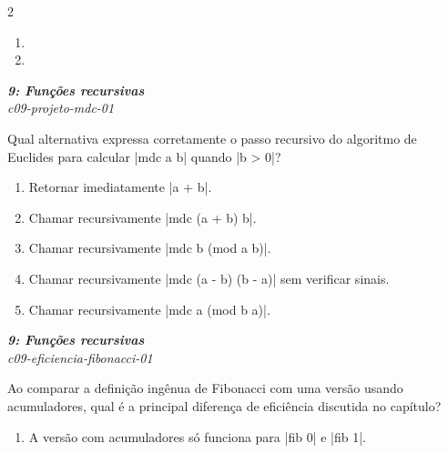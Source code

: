 \documentclass[a4paper,10pt,brazil]{article}
\begin{document}
\begin{multicols}{2}
\begin{enumerate}
  \item {}

  \item {}


\end{enumerate}

\begin{flushright}
  \footnotesize
  \textit{\textbf{9: Funções recursivas}}\\
  \textit{c09-projeto-mdc-01}\\

\end{flushright}
Qual alternativa expressa corretamente o passo recursivo do algoritmo de Euclides para calcular \haskellinline|mdc a b| quando \haskellinline|b > 0|?

\begin{enumerate}
  \item Retornar imediatamente \haskellinline|a + b|.

  \item Chamar recursivamente \haskellinline|mdc (a + b) b|.

  \item Chamar recursivamente \haskellinline|mdc b (mod a b)|.

  \item Chamar recursivamente \haskellinline|mdc (a - b) (b - a)| sem verificar sinais.

  \item Chamar recursivamente \haskellinline|mdc a (mod b a)|.


\end{enumerate}

\begin{flushright}
  \footnotesize
  \textit{\textbf{9: Funções recursivas}}\\
  \textit{c09-eficiencia-fibonacci-01}\\

\end{flushright}
Ao comparar a definição ingênua de Fibonacci com uma versão usando acumuladores, qual é a principal diferença de eficiência discutida no capítulo?

\begin{enumerate}
  \item A versão com acumuladores só funciona para \haskellinline|fib 0| e \haskellinline|fib 1|.


\end{enumerate}
\end{multicols}
\end{document}
